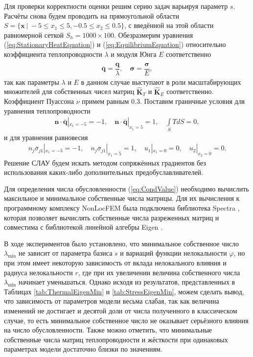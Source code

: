 Для проверки корректности оценки решим серию задач варьируя параметр $s$. Расчёты снова будем проводить на прямоугольной области $S = \{ \boldsymbol{x} \ | \ -5 \leqslant x_1 \leqslant 5, -0.5 \leqslant x_2 \leqslant 0.5  \}$, с введённой на этой области равномерной сеткой $S_h = 1000 \times 100$. Обезразмерим уравнения (\ref{eq:StationaryHeatEquation}) и (\ref{eq:EquilibriumEquation}) относительно коэффициента теплопроводности $\lambda$ и модуля Юнга $E$ соответственно
\begin{gather*}
	\overline{\boldsymbol{q}} = \dfrac{\boldsymbol{q}}{\lambda},
	\quad
	\overline{\boldsymbol{\sigma}} = \dfrac{\widehat{\boldsymbol{\sigma}}}{E},
\end{gather*}
так как параметры $\lambda$ и $E$ в данном случае выступают в роли масштабирующих множителей для собственных чисел матриц $\widehat{\textbf{K}}_T$ и $\widehat{\textbf{K}}_E$ соответственно. Коэффициент Пуассона $\nu$ примем равным 0.3. Поставим граничные условия для уравнения теплопроводности
\begin{gather*}
	\boldsymbol{n} \cdot \overline{\boldsymbol{q}} |_{x_1 = -5} = -1,
	\quad
	\boldsymbol{n} \cdot \overline{\boldsymbol{q}} |_{x_1 = 5} = 1,
	\quad
	\int\limits_S T dS = 0,
\end{gather*}
и для уравнения равновесия
\begin{gather*}
	n_j \overline{\sigma}_{j1} |_{x_1 = -5} = -1,
	\quad
	n_j \overline{\sigma}_{j1} |_{x_1 = 5} = 1,
	\quad
	u_1 |_{x_1 = 0} = 0,
	\quad
	u_2 |_{x_2 = 0} = 0.
\end{gather*}
Решение СЛАУ будем искать методом сопряжённых градиентов без использования каких-либо дополнительных предобуславливателей.

Для определения числа обусловленности (\ref{eq:CondValue}) необходимо вычислить максильное и минимальное собственные числа матрицы. Для их вычисления к программному комплексу NonLocFEM была подключена библиотека Spectra \cite{SpectraLib}, которая позволяет вычислять собственные числа разреженных матриц и совместима с библиотекой линейной алгебры Eigen \cite{EigenLib}.

В ходе экспериментов было установлено, что минимальное собственное число $\lambda_{\min}$ не зависит от параметра базиса $s$ и вариаций функции нелокальности $\varphi$, но при этом имеет некоторую зависимость от вклада нелокального влияния и радиуса нелокальности $r$, где при их увеличении величина собственного числа $\lambda_{\min}$ начинает уменьшаться. Однако исходя из результатов, представленных в Таблицах \ref{tab:ThermalEigenMin} и \ref{tab:StressEigenMin}, можем сделать вывод, что зависимость от параметров модели весьма слабая, так как величина изменений не достигает и десятой доли от числа полученного в классическом случае, то есть минимальное собственное число не оказывает серьёзного влияния на число обусловленности. Также можно отметить, что минимальные собственные числа матриц теплопроводности и жёсткости при одинаковых параметрах модели достаточно близки по значениям.

